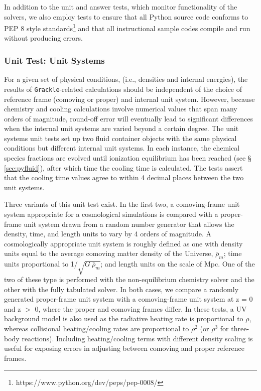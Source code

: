 In addition to the unit and answer tests, which monitor functionality
of the solvers, we also employ tests to ensure that all Python source
code conforms to PEP 8 style
standards\footnote{https://www.python.org/dev/peps/pep-0008/} and that
all instructional sample codes compile and run without producing
errors.

\subsubsection{Unit Test: Unit Systems}
\label{sec:test-units}

For a given set of physical conditions, (i.e., densities and internal
energies), the results of \texttt{Grackle}-related calculations should be
independent of the choice of reference frame (comoving or proper) and
internal unit system.  However, because chemistry and cooling
calculations involve numerical values that span many orders of
magnitude, round-off error will eventually lead to significant
differences when the internal unit systems are varied beyond a certain
degree.  The unit systems unit tests set up two fluid container
objects with the same physical conditions but different internal unit
systems.  In each instance, the chemical species fractions are evolved
until ionization equilibrium has been reached (see \S
\ref{sec:pyfluid}), after which time the cooling time is calculated.
The tests assert that the cooling time values agree to within 4
decimal places between the two unit systems.

Three variants of this unit test exist.  In the first two, a
comoving-frame unit system appropriate for a cosmological simulations
is compared with a proper-frame unit system drawn from a random number
generator that allows the density, time, and length units to vary by 4
orders of magnitude.  A cosmologically appropriate unit system is
roughly defined as one with density units equal to the average
comoving matter density of the Universe, $\bar{\rho}_{m}$; time units
proportional to 1/$\sqrt{G\ \bar{\rho}_{m}}$; and length units on the
scale of Mpc.  One of the two of these type is performed with the
non-equilibrium chemistry solver and the other with the fully
tabulated solver.  In both cases, we compare a randomly generated
proper-frame unit system with a comoving-frame unit system at z = 0
and z $>$ 0, where the proper and comoving frames differ.  In these
tests, a UV background model is also used as the radiative heating
rate is proportional to $\rho$, whereas collisional heating/cooling
rates are proportional to $\rho^{2}$ (or $\rho^{3}$ for three-body
reactions).  Including heating/cooling terms with different density
scaling is useful for exposing errors in adjusting between comoving
and proper reference frames.

